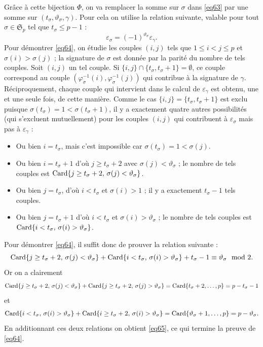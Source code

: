 \documentclass[12pt,francais, reqno]{smfart}
\numberwithin{equation}{section}
\newcommand{\card}{{\rm Card}}
\newcommand{\spp}{{\mathfrak S}_p}
\newcommand{\eps}{\varepsilon}
\newcommand{\tsig}{t_{\sigma}}
\newcommand{\tetasig}{\teta_{\sigma}}
\newcommand{\teta}{\vartheta}
\newcommand{\phisig}{\phii_{\sigma}}
\newcommand{\phii}{\varphi}
\begin{document}
Gr\^ace \`a cette bijection $\Phi$, on va remplacer la somme sur $\sigma $ dans \eqref{eq63} par une somme sur $(\tsig, \tetasig, \gamma)$. Pour cela on utilise la relation suivante, valable pour tout   $\sigma \in \spp$ tel que $\tsig \leq p-1$ : 
\begin{equation} \label{eq64}
\eps_\sigma  = (-1)^{\tetasig} \eps_\gamma.
\end{equation}
Pour d\'emontrer \eqref{eq64}, on \'etudie les couples $(i,j)$ tels que $1 \leq i <  j \leq p$ et $\sigma(i) > \sigma(j)$ ; la signature de $\sigma$ est donn\'ee par la parit\'e du nombre de tels couples. Soit $(i,j)$ un tel couple. Si $\{i,j\} \cap  \{ \tsig, \tsig+1\} = \emptyset$, ce couple correspond au couple $(\phisig^{-1}(i), \phisig^{-1}(j))$ qui contribue \`a la signature de $\gamma$. R\'eciproquement, chaque couple qui intervient dans le calcul de $\eps_\gamma$ est obtenu, une et une seule fois, de cette mani\`ere.  Comme le cas $\{i,j\} =  \{ \tsig, \tsig+1\}$
est exclu puisque $\sigma(\tsig) =1 < \sigma(\tsig+1)$, il y a exactement quatre autres possibilit\'es (qui s'excluent mutuellement) pour les couples $(i,j)$ qui contribuent \`a $\eps_\sigma$ mais pas \`a $\eps_\gamma$ : 
\begin{itemize}
\item Ou bien $i = \tsig$, mais c'est impossible car $\sigma(\tsig) = 1 < \sigma(j)$. 
\item Ou bien $i = \tsig  +1$ d'o\`u $j \geq \tsig  +  2$ avec $\sigma(j) < \tetasig$ ; le nombre de tels couples est $\card \{ j \geq \tsig + 2, \, \sigma(j) < \tetasig\}$.
\item Ou bien $j = \tsig$, d'o\`u $i < \tsig $ et $\sigma(i) > 1$ ; il y a exactement $\tsig - 1$ tels couples.
\item Ou bien $j = \tsig  +1$ d'o\`u $i < \tsig $ et $\sigma(i) > \tetasig$ ; le nombre de tels couples est $\card \{ i <   \tsig , \, \sigma(i) >  \tetasig\}$.
\end{itemize}
Pour d\'emontrer \eqref{eq64}, il suffit donc de prouver la relation suivante : 
\begin{equation} \label{eq65}
\card \{ j \geq \tsig + 2, \, \sigma(j) < \tetasig\} + \card \{ i <   \tsig , \, \sigma(i) >  \tetasig\}
+ \tsig - 1 \equiv \tetasig \mod 2. 
\end{equation}
Or on a clairement 
$$
\card \{ j \geq \tsig + 2, \, \sigma(j) < \tetasig\} + \card  \{ j \geq \tsig + 2, \, \sigma(j) >  \tetasig\} 
= \card\{ \tsig+2, \ldots, p \} = p - \tsig - 1 
$$
et
$$
\card  \{ i <   \tsig , \, \sigma(i) >  \tetasig\} + \card  \{ i \geq \tsig + 2, \, \sigma(i) >  \tetasig\} 
= \card\{ \tetasig+1, \ldots, p \} = p - \tetasig.   
$$
En additionnant ces deux relations on obtient \eqref{eq65}, ce qui termine la preuve de \eqref{eq64}.
\end{document}
